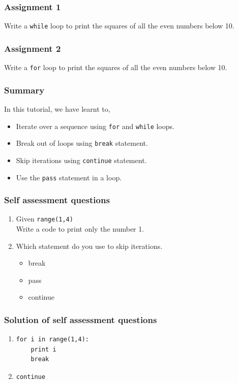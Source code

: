 \documentclass[17pt]{beamer}
\begin{document}
\begin{frame}
\frametitle{Assignment 1}
\label{sec-4}

  Write a \texttt{while} loop to print the squares of all the even
  numbers below 10. 
\end{frame}
\begin{frame}
\frametitle{Assignment 2}
\label{sec-5}

  Write a \texttt{for} loop to print the squares of all the even numbers
  below 10.
\end{frame}
\begin{frame}
\frametitle{Summary}
\label{sec-7}

 In this tutorial, we have learnt to,

\begin{itemize}
\item Iterate over a sequence using \texttt{for} and \texttt{while} loops.\pause
\item Break out of loops using \texttt{break} statement. \pause
\item Skip iterations using \texttt{continue} statement.\pause
\item Use the \texttt{pass} statement in a loop.
\end{itemize}
\end{frame}
\begin{frame}
\frametitle{Self assessment questions}
\label{sec-8}


\begin{enumerate}
\item Given \texttt{range(1,4)} \\ Write a code to print only the number 1.\pause
\vspace{12pt}
\item Which statement do you use to skip iterations.\pause
\begin{itemize}
\item break
\item pass
\item continue
\end{itemize}
\end{enumerate}
\end{frame}
\begin{frame}[fragile]
\frametitle{Solution of self assessment questions}
\label{sec-9}


\begin{enumerate}
\item \lstset{language=Python}
\begin{lstlisting}
for i in range(1,4):
    print i
    break
\end{lstlisting}
\vspace{8pt}
\item \texttt{continue}
\end{enumerate}
\end{frame}
\end{document}
